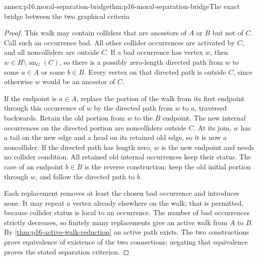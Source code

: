 \begin{annexitem}{annex:p16.moral-separation-bridge}{thm:p16-moral-separation-bridge}{The exact bridge between the two graphical criteria}
\begin{proof}
This walk may contain colliders that are ancestors of \(A\) or
\(B\) but not of \(C\). Call such an occurrence bad. All other
collider occurrences are activated by \(C\), and all noncolliders
are outside \(C\). If a bad occurrence has vertex \(w\), then
\(w\in H\setminus\operatorname{an}_G(C)\), so there is a
possibly zero-length directed path from \(w\) to some \(a\in A\)
or some \(b\in B\).
Every vertex on that directed path is outside \(C\), since otherwise
\(w\) would be an ancestor of \(C\).

If the endpoint is \(a\in A\), replace the portion of the walk
from its first endpoint through this occurrence of \(w\) by the
directed path from \(w\) to \(a\), traversed backwards. Retain
the old portion from \(w\) to the \(B\) endpoint. The new internal
occurrences on the directed portion are noncolliders outside \(C\).
At its join, \(w\) has a tail on the new edge and a head on its
retained old edge, so it is now a noncollider. If the directed path
has length zero, \(w\) is the new endpoint and needs no collider
condition. All retained old internal occurrences keep their status.
The case of an endpoint \(b\in B\) is the reverse construction:
keep the old initial portion through \(w\), and follow the directed
path to \(b\).

Each replacement removes at least the chosen bad occurrence and
introduces none. It may repeat a vertex already elsewhere on the walk;
that is permitted, because collider status is local to an occurrence.
The number of bad occurrences strictly decreases, so finitely many
replacements give an active walk from \(A\) to \(B\). By
\cref{thm:p16-active-walk-reduction} an active path exists. The two
constructions prove equivalence of existence of the two connections;
negating that equivalence proves the stated separation criterion.
\end{proof}
\end{annexitem}

